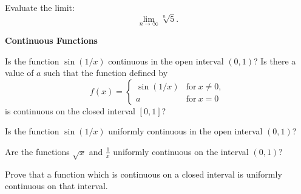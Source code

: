 \begin{Exercise}
  \label{exercise limit sqrt n 5}
  Evaluate the limit:
  \[
  \lim_{n \to \infty} \sqrt[n]{5}.
  \]

\end{Exercise}



\begin{large}
  \noindent
  \textbf{Continuous Functions}
\end{large}



\begin{Exercise}
  \label{exercise sin 1/x continuous}
  Is the function $\sin(1/x)$ continuous in the open interval $(0,1)$?
  Is there a value of $a$ such that the function defined by
  \[
  f(x) =
  \begin{cases}
    \sin(1/x) &\mathrm{for}\ x \neq 0, \\
    a &\mathrm{for}\ x = 0
  \end{cases}
  \]
  is continuous on the closed interval $[0,1]$?

\end{Exercise}

\begin{Exercise}
  \label{exercise sin 1/x uniformly continuous}
  Is the function $\sin(1/x)$ uniformly continuous in the open interval $(0,1)$?

\end{Exercise}


\begin{Exercise}
  \label{exercise sqrt x uniformly continuous}
  Are the functions $\sqrt{x}$ and $\frac{1}{x}$ uniformly continuous on 
  the interval $(0,1)$?

\end{Exercise}



\begin{Exercise}
  \label{exercise continuous closed uniformly}
  Prove that a function which is continuous on a closed interval is
  uniformly continuous on that interval.

\end{Exercise}







